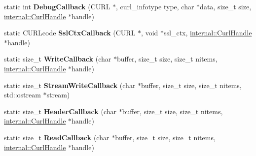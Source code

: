 \begin{DoxyCompactItemize}
\item 
\hypertarget{structcurlpp_1_1internal_1_1Callbacks_ab09b4081b01ef53c602643b68c7c3ddb}{static int {\bfseries Debug\-Callback} (C\-U\-R\-L $\ast$, curl\-\_\-infotype type, char $\ast$data, size\-\_\-t size, \hyperlink{classcurlpp_1_1internal_1_1CurlHandle}{internal\-::\-Curl\-Handle} $\ast$handle)}\label{structcurlpp_1_1internal_1_1Callbacks_ab09b4081b01ef53c602643b68c7c3ddb}

\item 
\hypertarget{structcurlpp_1_1internal_1_1Callbacks_ad62a0abad12fb7d3e25ead35b500973a}{static C\-U\-R\-Lcode {\bfseries Ssl\-Ctx\-Callback} (C\-U\-R\-L $\ast$, void $\ast$ssl\-\_\-ctx, \hyperlink{classcurlpp_1_1internal_1_1CurlHandle}{internal\-::\-Curl\-Handle} $\ast$handle)}\label{structcurlpp_1_1internal_1_1Callbacks_ad62a0abad12fb7d3e25ead35b500973a}

\item 
\hypertarget{structcurlpp_1_1internal_1_1Callbacks_a5f1b4922a3f68892d25db51bcce627b3}{static size\-\_\-t {\bfseries Write\-Callback} (char $\ast$buffer, size\-\_\-t size, size\-\_\-t nitems, \hyperlink{classcurlpp_1_1internal_1_1CurlHandle}{internal\-::\-Curl\-Handle} $\ast$handle)}\label{structcurlpp_1_1internal_1_1Callbacks_a5f1b4922a3f68892d25db51bcce627b3}

\item 
\hypertarget{structcurlpp_1_1internal_1_1Callbacks_a68277a58922263611d75cb146fd58801}{static size\-\_\-t {\bfseries Stream\-Write\-Callback} (char $\ast$buffer, size\-\_\-t size, size\-\_\-t nitems, std\-::ostream $\ast$stream)}\label{structcurlpp_1_1internal_1_1Callbacks_a68277a58922263611d75cb146fd58801}

\item 
\hypertarget{structcurlpp_1_1internal_1_1Callbacks_a8297769942b956c1d265064ee1327665}{static size\-\_\-t {\bfseries Header\-Callback} (char $\ast$buffer, size\-\_\-t size, size\-\_\-t nitems, \hyperlink{classcurlpp_1_1internal_1_1CurlHandle}{internal\-::\-Curl\-Handle} $\ast$handle)}\label{structcurlpp_1_1internal_1_1Callbacks_a8297769942b956c1d265064ee1327665}

\item 
\hypertarget{structcurlpp_1_1internal_1_1Callbacks_a7eda5772a5a9c54fc1a2c1360bcc941d}{static size\-\_\-t {\bfseries Read\-Callback} (char $\ast$buffer, size\-\_\-t size, size\-\_\-t nitems, \hyperlink{classcurlpp_1_1internal_1_1CurlHandle}{internal\-::\-Curl\-Handle} $\ast$handle)}\label{structcurlpp_1_1internal_1_1Callbacks_a7eda5772a5a9c54fc1a2c1360bcc941d}


\end{DoxyCompactItemize}
